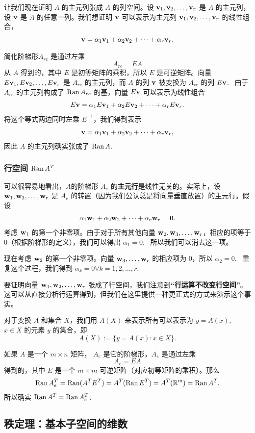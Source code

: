 让我们现在证明 $A$ 的主元列张成 $A$ 的列空间。设 $\mathbf{v}_1, \mathbf{v}_2, \dots, \mathbf{v}_r$ 是 $A$ 的主元列，设 $\mathbf{v}$ 是 $A$ 的任意一列。我们想证明 $\mathbf{v}$ 可以表示为主元列 $\mathbf{v}_1, \mathbf{v}_2, \dots, \mathbf{v}_r$ 的线性组合，
$$\mathbf{v} = \alpha_1 \mathbf{v}_1 + \alpha_2 \mathbf{v}_2 + \dots + \alpha_r \mathbf{v}_r.$$

简化阶梯形$A_{re}$ 是通过左乘 $$A_{re} = EA$$
从 $A$ 得到的，其中 $E$ 是初等矩阵的乘积，所以 $E$ 是可逆矩阵。向量 $E \mathbf{v}_1, E \mathbf{v}_2, \dots, E \mathbf{v}_r$ 是 $A_{re}$ 的主元列，而 $A$ 的列 $\mathbf{v}$ 被变换为 $A_{re}$ 的列 $E \mathbf{v}$. ~由于 $A_{re}$ 的主元列构成了 $\operatorname{Ran} A_{re}$ 的基，向量 $E \mathbf{v}$ 可以表示为线性组合
$$E \mathbf{v} = \alpha_1 E \mathbf{v}_1 + \alpha_2 E \mathbf{v}_2 + \dots + \alpha_r E \mathbf{v}_r.$$
将这个等式两边同时左乘 $E^{-1}$，我们得到表示
$$\mathbf{v} = \alpha_1 \mathbf{v}_1 + \alpha_2 \mathbf{v}_2 + \dots + \alpha_r \mathbf{v}_r,$$
因此 $A$ 的主元列确实张成了 $\operatorname{Ran} A$. ~

\subsubsection{\texorpdfstring{行空间 $\operatorname{Ran} A^T$}{行空间 Ran A^T}}\label{sec:02-07-02-03}

可以很容易地看出，$A$的阶梯形 $A_e$ 的\textbf{主元行}是线性无关的。实际上，设 $\mathbf{w}_1, \mathbf{w}_2, \dots, \mathbf{w}_r$ 是 $A_e$ 的转置（因为我们公认总是将向量垂直放置）的主元行。假设 $$\alpha_1 \mathbf{w}_1 + \alpha_2 \mathbf{w}_2 + \dots + \alpha_r \mathbf{w}_r = \mathbf{0}.$$
考虑 $\mathbf{w}_1$ 的第一个非零项。由于对于所有其他向量 $\mathbf{w}_2, \mathbf{w}_3, \dots, \mathbf{w}_r$，相应的项等于 0（根据阶梯形的定义），我们可以得出 $\alpha_1 = 0$. ~所以我们可以消去这一项。

现在考虑 $\mathbf{w}_2$ 的第一个非零项。向量 $\mathbf{w}_3, \dots, \mathbf{w}_r$ 的相应项为 0，所以 $\alpha_2 = 0$. ~重复这个过程，我们得到 $\alpha_k = 0  \forall k = 1, 2, \dots, r$. ~

要证明向量 $\mathbf{w}_1, \mathbf{w}_2, \dots, \mathbf{w}_r$ 张成了行空间，我们注意到\textbf{“行运算不改变行空间”}。这可以从直接分析行运算得到，但我们在这里提供一种更正式的方式来演示这个事实。

对于变换 $A$ 和集合 $X$，我们用 $A(X)$ 来表示所有可以表示为 $y = A(x)$, $x \in X$ 的元素 $y$ 的集合，即
$$A(X) := \{ y = A(x) : x \in X \}.$$

如果 $A$ 是一个 $m \times n$ 矩阵， $A_e$ 是它的阶梯形，$A_e$ 是通过左乘
$$A_e = EA$$
得到的，其中 $E$ 是一个 $m \times m$ 可逆矩阵（对应初等矩阵的乘积）。那么
$$\operatorname{Ran} A_e^T = \operatorname{Ran}(A^T E^T) = A^T(\operatorname{Ran} E^T) = A^T(\mathbb{R}^m) = \operatorname{Ran} A^T,$$
所以确实 $\operatorname{Ran} A^T = \operatorname{Ran} A_e^T$.

\subsection{秩定理：基本子空间的维数}\label{sec:02-07-03}

